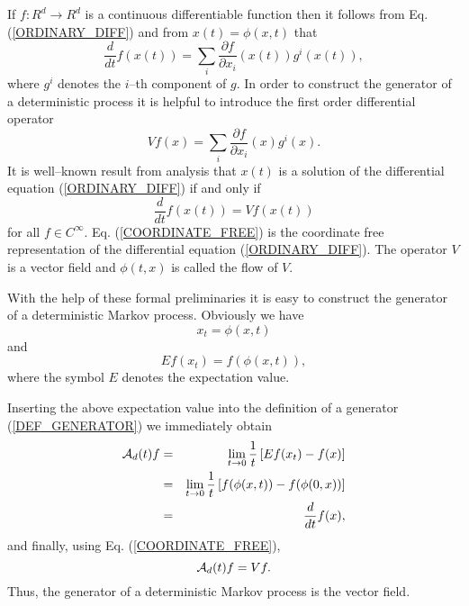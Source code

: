 If $f:R^d \rightarrow R^d$ is a continuous differentiable function
then it follows from Eq. (\ref{ORDINARY_DIFF}) and from
$x(t)=\phi(x,t)$ that
\begin{equation*}
\frac{d}{dt} f(x(t)) = \sum_i \frac{\partial f}{\partial x_i}
          (x(t)) g^i(x(t)),
\end{equation*}
where $g^i$ denotes the $i$--th component of $g$. 
In order to construct the generator of a deterministic process
it is helpful to  introduce 
the first order differential operator
\begin{equation*}
Vf(x) = \sum_i \frac{\partial f}{\partial x_i}
          (x) g^i(x).
\end{equation*}
It is well--known result from analysis that 
$x(t)$ is a solution of the differential equation (\ref{ORDINARY_DIFF}) 
if and only if 
\begin{equation}
\label{COORDINATE_FREE}
\frac{d}{dt}f(x(t)) = V f(x(t))
\end{equation}
for all $f\in C^{\infty}$. Eq. (\ref{COORDINATE_FREE}) is the 
coordinate free representation of the differential equation 
(\ref{ORDINARY_DIFF}). The operator $V$ is a vector field and 
$\phi(t,x)$ is called the flow of $V$.

With the help of these formal preliminaries it is easy to 
construct the generator of a deterministic Markov process.
Obviously we have
\begin{equation*}
x_t = \phi(x,t)
\end{equation*}
and
\begin{equation*}
Ef(x_t) = f(\phi(x,t)),
\end{equation*}
where the symbol $E$ denotes the expectation value.

Inserting the above expectation value into the definition of a 
generator (\ref{DEF_GENERATOR}) we immediately obtain
\begin{eqnarray*}
{\cal{A}}_d(t) f & = & \lim_{t\rightarrow 0} \frac{1}{t}
                        \left[ Ef(x_t) - f(x)\right] \\
             & = & \lim_{t\rightarrow 0} \frac{1}{t}
                        \left[ f(\phi(x,t)) - f(\phi(0,x))\right] \\
              & = & \frac{d}{dt} f(x) ,
\end{eqnarray*}
and finally, using Eq. (\ref{COORDINATE_FREE}),
\begin{equation*}
{\cal{A}}_d(t) f = Vf.
\end{equation*}
Thus, the generator of a deterministic Markov process is the 
vector field.

